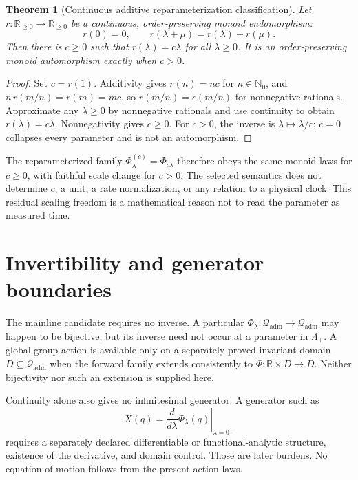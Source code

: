\documentclass[11pt]{article}
\newcommand{\Qadm}{\mathcal Q_{\mathrm{adm}}}
\newcommand{\Lam}{\Lambda_+}
\newtheorem{theorem}{Theorem}
\begin{document}
\begin{theorem}[Continuous additive reparameterization classification]
Let \(r:\mathbb R_{\geq0}\to\mathbb R_{\geq0}\) be a continuous,
order-preserving monoid endomorphism:
\[
 r(0)=0,\qquad r(\lambda+\mu)=r(\lambda)+r(\mu).
\]
Then there is \(c\geq0\) such that \(r(\lambda)=c\lambda\) for all
\(\lambda\geq0\). It is an order-preserving monoid automorphism exactly when
\(c>0\).
\end{theorem}

\begin{proof}
Set \(c=r(1)\). Additivity gives \(r(n)=nc\) for
\(n\in\mathbb N_0\), and \(n\,r(m/n)=r(m)=mc\), so
\(r(m/n)=c(m/n)\) for nonnegative rationals. Approximate any
\(\lambda\geq0\) by nonnegative rationals and use continuity to obtain
\(r(\lambda)=c\lambda\). Nonnegativity gives \(c\geq0\). For \(c>0\), the
inverse is \(\lambda\mapsto\lambda/c\); \(c=0\) collapses every parameter and
is not an automorphism.
\end{proof}

The reparameterized family
\(\Phi^{(c)}_\lambda=\Phi_{c\lambda}\) therefore obeys the same monoid laws
for \(c\geq0\), with faithful scale change for \(c>0\). The selected semantics
does not determine \(c\), a unit, a rate normalization, or any relation to a
physical clock. This residual scaling freedom is a mathematical reason not to
read the parameter as measured time.

\section{Invertibility and generator boundaries}

The mainline candidate requires no inverse. A particular
\(\Phi_\lambda:\Qadm\to\Qadm\) may happen to be bijective, but its inverse
need not occur at a parameter in \(\Lam\). A global group action is available
only on a separately proved invariant domain \(D\subseteq\Qadm\) when the
forward family extends consistently to
\(\widetilde\Phi:\mathbb R\times D\to D\). Neither bijectivity nor such an
extension is supplied here.

Continuity alone also gives no infinitesimal generator. A generator such as
\[
 X(q)=\left.\frac{d}{d\lambda}\Phi_\lambda(q)\right|_{\lambda=0^+}
\]
requires a separately declared differentiable or functional-analytic
structure, existence of the derivative, and domain control. Those are later
burdens. No equation of motion follows from the present action laws.
\end{document}
